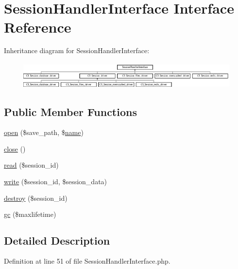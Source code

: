 \hypertarget{interface_session_handler_interface}{}\section{Session\+Handler\+Interface Interface Reference}
\label{interface_session_handler_interface}
Inheritance diagram for Session\+Handler\+Interface\+:\begin{figure}[H]
\begin{center}
\leavevmode
\includegraphics[height=1.414141cm]{interface_session_handler_interface}
\end{center}
\end{figure}
\subsection*{Public Member Functions}
\begin{DoxyCompactItemize}
\item 
\mbox{\hyperlink{interface_session_handler_interface_a614b5cf3840833913c7a73260ed28e02}{open}} (\$save\+\_\+path, \$\mbox{\hyperlink{waiter_2order_8php_afb270cde4944e425a37cf277116a7f43}{name}})
\item 
\mbox{\hyperlink{interface_session_handler_interface_aa69c8bf1f1dcf4e72552efff1fe3e87e}{close}} ()
\item 
\mbox{\hyperlink{interface_session_handler_interface_a5bbf84ebf657be4eaccc0582377c76bf}{read}} (\$session\+\_\+id)
\item 
\mbox{\hyperlink{interface_session_handler_interface_ad9d124885be93668f1dbf6aace5964f5}{write}} (\$session\+\_\+id, \$session\+\_\+data)
\item 
\mbox{\hyperlink{interface_session_handler_interface_aaec5812f6b4eb6835f88d3baa06a002a}{destroy}} (\$session\+\_\+id)
\item 
\mbox{\hyperlink{interface_session_handler_interface_a57aff7ee0656d8aa75d545fb8b3ae35d}{gc}} (\$maxlifetime)
\end{DoxyCompactItemize}


\subsection{Detailed Description}


Definition at line 51 of file Session\+Handler\+Interface.\+php.




